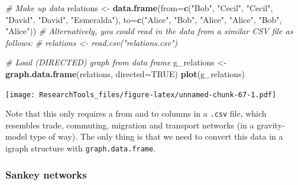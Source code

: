 \documentclass[]{article}
\newenvironment{Shaded}{\begin{snugshade}}{\end{snugshade}}
\newcommand{\KeywordTok}[1]{\textcolor[rgb]{0.13,0.29,0.53}{\textbf{#1}}}
\newcommand{\DataTypeTok}[1]{\textcolor[rgb]{0.13,0.29,0.53}{#1}}
\newcommand{\StringTok}[1]{\textcolor[rgb]{0.31,0.60,0.02}{#1}}
\newcommand{\CommentTok}[1]{\textcolor[rgb]{0.56,0.35,0.01}{\textit{#1}}}
\newcommand{\OtherTok}[1]{\textcolor[rgb]{0.56,0.35,0.01}{#1}}
\newcommand{\NormalTok}[1]{#1}
\theoremstyle{definition}
\theoremstyle{definition}
\theoremstyle{definition}
\theoremstyle{remark}
\begin{document}
\begin{Shaded}
\begin{Highlighting}[]
\CommentTok{# Make up data}
\NormalTok{relations <-}\StringTok{ }\KeywordTok{data.frame}\NormalTok{(}\DataTypeTok{from=}\KeywordTok{c}\NormalTok{(}\StringTok{"Bob"}\NormalTok{, }\StringTok{"Cecil"}\NormalTok{, }\StringTok{"Cecil"}\NormalTok{, }\StringTok{"David"}\NormalTok{, }\StringTok{"David"}\NormalTok{, }\StringTok{"Esmeralda"}\NormalTok{),}
                        \DataTypeTok{to=}\KeywordTok{c}\NormalTok{(}\StringTok{"Alice"}\NormalTok{, }\StringTok{"Bob"}\NormalTok{, }\StringTok{"Alice"}\NormalTok{, }\StringTok{"Alice"}\NormalTok{, }\StringTok{"Bob"}\NormalTok{, }\StringTok{"Alice"}\NormalTok{))}
\CommentTok{# Alternatively, you could read in the data from a similar CSV file as follows:}
\CommentTok{# relations <- read.csv("relations.csv")}

\CommentTok{# Load (DIRECTED) graph from data frame }
\NormalTok{g_relations <-}\StringTok{ }\KeywordTok{graph.data.frame}\NormalTok{(relations, }\DataTypeTok{directed=}\OtherTok{TRUE}\NormalTok{)}
\KeywordTok{plot}\NormalTok{(g_relations)}
\end{Highlighting}
\end{Shaded}

\texttt{[image: ResearchTools\_files/figure-latex/unnamed-chunk-67-1.pdf]}

Note that this only requires a from and to columns in a \texttt{.csv}
file, which resembles trade, commuting, migration and transport networks
(in a gravity-model type of way). The only thing is that we need to
convert this data in a igraph structure with \texttt{graph.data.frame}.

\subsubsection{Sankey networks}\label{sankey-networks}
\end{document}
